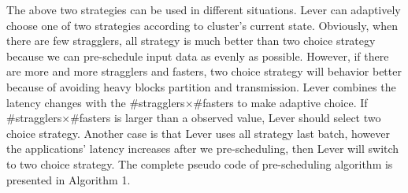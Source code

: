   The above two strategies can be used in different situations. Lever can adaptively choose one of two strategies according to cluster's current state. Obviously, when there are few stragglers, all strategy is much better than two choice strategy because we can pre-schedule input data as evenly as possible. However, if there are more and more stragglers and fasters, two choice strategy will behavior better because of avoiding heavy blocks partition and transmission. Lever combines the latency changes with the \#stragglers$\times$\#fasters to make adaptive choice. If \#stragglers$\times$\#fasters is larger than a observed value, Lever should select two choice strategy. Another case is that Lever uses all strategy last batch, however the applications' latency increases after we pre-scheduling, then Lever will switch to two choice strategy. The complete pseudo code of pre-scheduling algorithm is presented in Algorithm 1.
